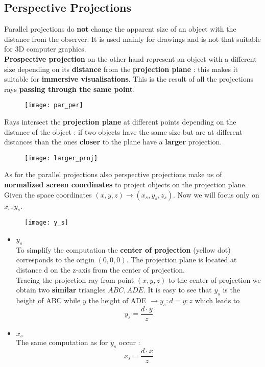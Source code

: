 \subsection{Perspective Projections}
Parallel projections do \textbf{not} change the apparent size of an object with the distance from the observer. It is used mainly for drawings and is not that suitable for 3D computer graphics.\\
\textbf{Prospective projection} on the other hand represent an object with a different size depending on its \textbf{distance} from the \textbf{projection plane} : this makes it suitable for \textbf{immersive visualisations}. This is the result of all the projections rays \textbf{passing through the same point}.
\begin{figure}[H]
 \centering
  \texttt{[image: par\_per]}
\end{figure}
Rays intersect the \textbf{projection plane} at different points depending on the distance of the object : if two objects have the same size but are at different distances than the ones \textbf{closer} to the plane have a \textbf{larger} projection.
\begin{figure}[H]
 \centering
  \texttt{[image: larger\_proj]}
\end{figure}
As for the parallel projections	also perspective projections make us of \textbf{normalized screen coordinates} to project objects on the projection plane.
Given the space coordinates $(x,y,z) \to (x_s,y_s,z_s)$. Now we will focus only on 
$ x_s,y_s$. \\
\begin{figure}[H]
 \centering
  \texttt{[image: y\_s]}
\end{figure}
\begin{itemize}
\item $y_s$\\
To simplify the computation the \textbf{center of projection} (yellow dot) corresponds to the origin $(0,0,0)$. The projection plane is located at distance d on the z-axis from the center of projection.\\
Tracing the projection ray from point $(x,y,z)$ to the center of projection we obtain two \textbf{similar} triangles $ABC , ADE $. It is easy to see that $y_s$ is the height of ABC while $y$ the height of ADE $\to y_s : d = y:z$ which leads to
\[
\boxed{y_s = \frac{d \cdot y}{z}}	
\] 
\item $x_s$ \\
The same computation as for $y_s$ occur : 
\[
\boxed{x_s = \frac{d \cdot x}{z}}	
\]
\end{itemize}
